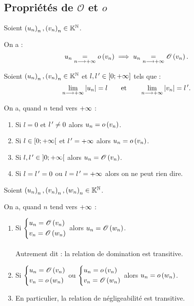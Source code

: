 \subsection{Propriétés de \(\mathscr{O}\) et \(o\)}

\begin{prop}
Soient \(\left(u_n\right)_n,\left(v_n\right)_n\in\mathbb{K}^{\mathbb{N}}\).

On a : \[u_n\underset{n\longrightarrow+\infty}{=}o\left(v_n\right)\implies u_n\underset{n\longrightarrow+\infty}{=}\mathscr{O}\left(v_n\right).\]
\end{prop}

\begin{prop}
Soient \(\left(u_n\right)_n,\left(v_n\right)_n\in\mathbb{K}^{\mathbb{N}}\) et \(l,l^{\,\prime}\in\left[0;+\infty\right]\) tels que : \[\lim_{n\longrightarrow+\infty}\left\lvert u_n\right\rvert=l\qquad\text{et}\qquad\lim_{n\longrightarrow+\infty}\left\lvert v_n\right\rvert=l^{\,\prime}.\]

On a, quand \(n\) tend vers \(+\infty\) :

\begin{enumerate}
    \item Si \(l=0\) et \(l^{\,\prime}\not=0\) alors \(u_n=o\left(v_n\right)\). \\
    \item Si \(l\in\left[0;+\infty\right[\) et \(l^{\,\prime}=+\infty\) alors \(u_n=o\left(v_n\right)\). \\
    \item Si \(l,l^{\,\prime}\in\left]0;+\infty\right[\) alors \(u_n=\mathscr{O}\left(v_n\right)\). \\
    \item Si \(l=l^{\,\prime}=0\) ou \(l=l^{\,\prime}=+\infty\) alors on ne peut rien dire.
\end{enumerate}
\end{prop}

\begin{prop}[Transitivités]
Soient \(\left(u_n\right)_n,\left(v_n\right)_n,\left(w_n\right)_n\in\mathbb{K}^{\mathbb{N}}\).

On a, quand \(n\) tend vers \(+\infty\) :

\begin{enumerate}
    \item Si \(\begin{dcases}
        u_n=\mathscr{O}\left(v_n\right) \\
        v_n=\mathscr{O}\left(w_n\right)
    \end{dcases}\) alors \(u_n=\mathscr{O}\left(w_n\right)\). \\\\ Autrement dit : la relation de domination est transitive. \\
    \item Si \(\begin{dcases}
        u_n=\mathscr{O}\left(v_n\right) \\
        v_n=o\left(w_n\right)
    \end{dcases}\) ou \(\begin{dcases}
        u_n=o\left(v_n\right) \\
        v_n=\mathscr{O}\left(w_n\right)
    \end{dcases}\) alors \(u_n=o\left(w_n\right)\). \\
    \item En particulier, la relation de négligeabilité est transitive.
\end{enumerate}
\end{prop}

